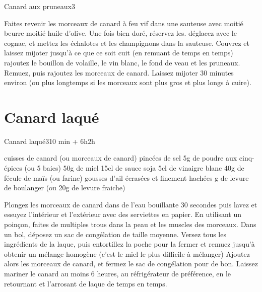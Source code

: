 {\begin{recette}{Canard aux pruneaux}{3}{}{}
\begin{preparation}
\etape Faites revenir les morceaux de canard à feu vif dans une sauteuse avec moitié beurre moitié huile d'olive. Une fois bien 
doré, réservez les.
\etape déglacez avec le cognac, et mettez les échalotes et les champignons dans la sauteuse. Couvrez et laissez mijoter jusqu'à 
ce que ce soit cuit (en remuant de temps en temps)
\etape rajoutez le bouillon de volaille, le vin blanc, le fond de veau et les pruneaux. Remuez, puis rajoutez les morceaux de 
canard.
\etape Laissez mijoter 30 minutes environ (ou plus longtemps si les morceaux sont plus gros et plus longs à cuire).
\end{preparation}

\end{recette}

\section{Canard laqué}
\begin{recette}{Canard laqué}{3}{10 min + 6h}{2h}

\begin{ingredients}
 cuisses de canard (ou morceaux de canard)
 pincées de sel
\ingredient 5g de poudre aux cinq-épices (ou 5 baies)
\ingredient 50g de miel
\ingredient 15cl de sauce soja
\ingredient 5cl de vinaigre blanc
\ingredient 40g de fécule de maïs (ou farine)
 gousses d'ail écrasées et finement hachées
 g de levure de boulanger (ou 20g de levure fraiche)
\end{ingredients}

\begin{preparation}
\etape Plongez les morceaux de canard dans de l'eau bouillante 30 secondes puis lavez et essuyez l'intérieur et l'extérieur avec 
des serviettes en papier.
\etape En utilisant un poinçon, faites de multiples trous dans la peau et les muscles des morceaux.
\etape Dans un bol, déposez un sac de congélation de taille moyenne. Versez tous les ingrédients de la laque, puis entortillez 
la poche pour la fermer et remuez jusqu'à obtenir un mélange homogène (c'est le miel le plus difficile à mélanger)
\etape Ajoutez alors les morceaux de canard, et fermez le sac de congélation pour de bon.
\etape Laissez mariner le canard au moins 6 heures, au réfrigérateur de préférence, en le retournant et l'arrosant de laque de 
temps en temps.
\end{preparation}


\end{recette}}
